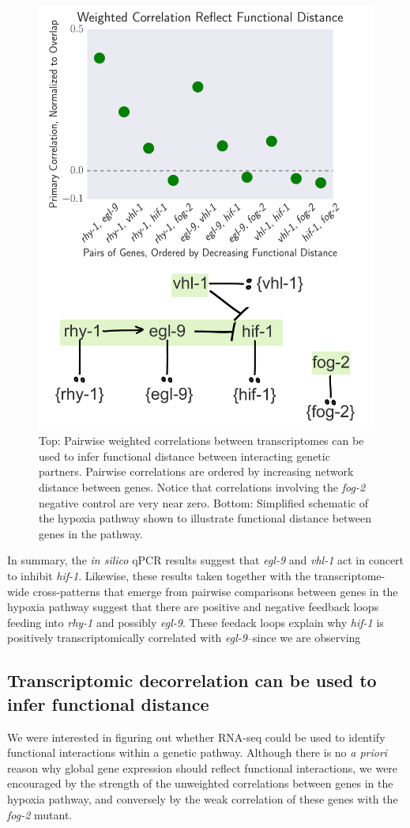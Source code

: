 \documentclass[9pt,twocolumn,twoside]{pnas-new}
\newcommand{\egl}{\emph{egl-9}}
\newcommand{\rhy}{\emph{rhy-1}}
\newcommand{\vhl}{\emph{vhl-1}}
\newcommand{\hif}{\emph{hif-1}}
\newcommand{\fog}{\emph{fog-2}}
\begin{document}
\begin{figure}[tbhp]
\centering
\includegraphics[width=.72\linewidth]{figs/functional_distance.pdf}
\caption{Top: Pairwise weighted correlations between transcriptomes can be used to infer functional distance between interacting genetic partners. Pairwise correlations are ordered by increasing network distance between genes. Notice that correlations involving the \fog{} negative control are very near zero. Bottom: Simplified schematic of the hypoxia pathway shown to illustrate functional distance between genes in the pathway.}
\label{fig:decorrelation}
\end{figure}

In summary, the \emph{in silico} qPCR results suggest that \egl{} and \vhl{} act in concert to inhibit \hif{}. Likewise, these results taken together with the transcriptome-wide cross-patterns that emerge from pairwise comparisons between genes in the hypoxia pathway suggest that there are positive and negative feedback loops feeding into \rhy{} and possibly \egl{}. These feedack loops explain why \hif{} is positively transcriptomically correlated with \egl{}--since we are observing

\subsection{Transcriptomic decorrelation can be used to infer functional distance}
\label{sub:decorrelation}
We were interested in figuring out whether RNA-seq could be used to identify functional interactions within a genetic pathway. Although there is no \emph{a priori} reason why global gene expression should reflect functional interactions, we were encouraged by the strength of the unweighted correlations between genes in the hypoxia pathway, and conversely by the weak correlation of these genes with the \fog{} mutant.
\end{document}
